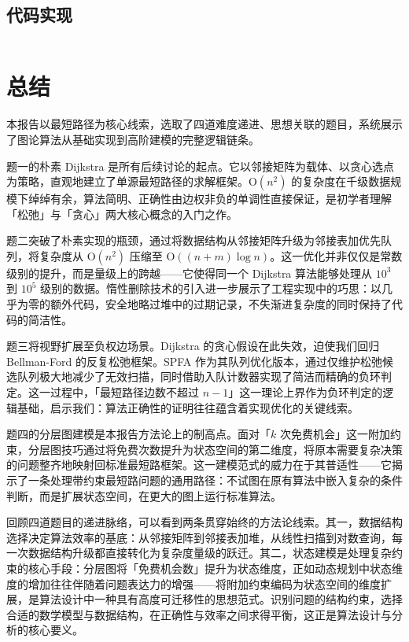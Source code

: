\documentclass[12pt, a4paper]{academics}
\begin{document}
\subsection{代码实现}

\inputminted{c++}{../src/p4_layered_graph.cpp}

\section{总结}

本报告以最短路径为核心线索，选取了四道难度递进、思想关联的题目，系统展示了图论算法从基础实现到高阶建模的完整逻辑链条。

题一的朴素 Dijkstra 是所有后续讨论的起点。它以邻接矩阵为载体、以贪心选点为策略，直观地建立了单源最短路径的求解框架。$\mathrm{O}(n^2)$ 的复杂度在千级数据规模下绰绰有余，算法简明、正确性由边权非负的单调性直接保证，是初学者理解「松弛」与「贪心」两大核心概念的入门之作。

题二突破了朴素实现的瓶颈，通过将数据结构从邻接矩阵升级为邻接表加优先队列，将复杂度从 $\mathrm{O}(n^2)$ 压缩至 $\mathrm{O}((n+m) \log n)$。这一优化并非仅仅是常数级别的提升，而是量级上的跨越——它使得同一个 Dijkstra 算法能够处理从 $10^3$ 到 $10^5$ 级别的数据。惰性删除技术的引入进一步展示了工程实现中的巧思：以几乎为零的额外代码，安全地略过堆中的过期记录，不失渐进复杂度的同时保持了代码的简洁性。

题三将视野扩展至负权边场景。Dijkstra 的贪心假设在此失效，迫使我们回归 Bellman-Ford 的反复松弛框架。SPFA 作为其队列优化版本，通过仅维护松弛候选队列极大地减少了无效扫描，同时借助入队计数器实现了简洁而精确的负环判定。这一过程中，「最短路径边数不超过 $n-1$」这一理论上界作为负环判定的逻辑基础，启示我们：算法正确性的证明往往蕴含着实现优化的关键线索。

题四的分层图建模是本报告方法论上的制高点。面对「$k$ 次免费机会」这一附加约束，分层图技巧通过将免费次数提升为状态空间的第二维度，将原本需要复杂决策的问题整齐地映射回标准最短路框架。这一建模范式的威力在于其普适性——它揭示了一条处理带约束最短路问题的通用路径：不试图在原有算法中嵌入复杂的条件判断，而是扩展状态空间，在更大的图上运行标准算法。

回顾四道题目的递进脉络，可以看到两条贯穿始终的方法论线索。其一，数据结构选择决定算法效率的基底：从邻接矩阵到邻接表加堆，从线性扫描到对数查询，每一次数据结构升级都直接转化为复杂度量级的跃迁。其二，状态建模是处理复杂约束的核心手段：分层图将「免费机会数」提升为状态维度，正如动态规划中状态维度的增加往往伴随着问题表达力的增强——将附加约束编码为状态空间的维度扩展，是算法设计中一种具有高度可迁移性的思想范式。识别问题的结构约束，选择合适的数学模型与数据结构，在正确性与效率之间求得平衡，这正是算法设计与分析的核心要义。
\end{document}
